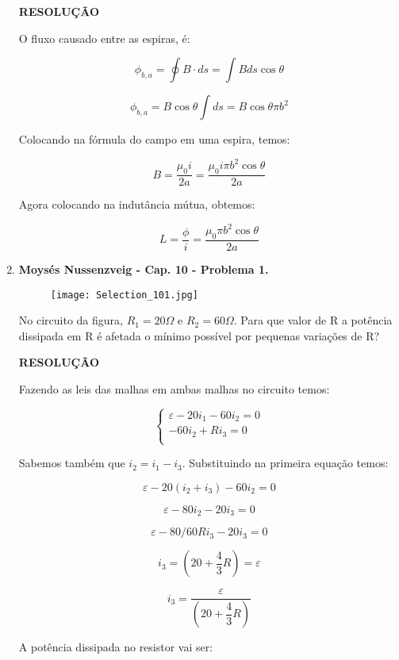 \documentclass[11pt,a4paper]{article}
\begin{document}
\begin{enumerate}
\textbf{RESOLUÇÃO}

O fluxo causado entre as espiras, é:

$$\phi_{b,a} = \displaystyle\oint B \cdot ds = \displaystyle\int B ds \cos \theta$$

$$\phi_{b,a} = B \cos \theta \displaystyle\int ds = B \cos \theta \pi b^2$$

Colocando na fórmula do campo em uma espira, temos:

$$B = \displaystyle\dfrac{\mu_0 i}{2a} = \displaystyle\dfrac{\mu_0 i \pi b^2 \cos \theta}{2a}$$

Agora colocando na indutância mútua, obtemos:

$$L = \displaystyle\dfrac{\phi}{i} = \displaystyle\dfrac{\mu_0 \pi b^2 \cos \theta}{2a}$$

\item \textbf{Moysés Nussenzveig - Cap. 10 - Problema 1.}

\begin{figure}[h]	
\centering %
\texttt{[image: Selection\_101.jpg]} 
\end{figure}

No circuito da figura, $R_1 = 20 \Omega$ e $R_2 = 60 \Omega$. Para que valor de R a potência dissipada em R é afetada o mínimo possível por pequenas variações de R?

\textbf{RESOLUÇÃO}

Fazendo as leis das malhas em ambas malhas no circuito temos:

$$
\begin{cases}
\varepsilon - 20 i_1 - 60 i_2 = 0 \\
-60 i_2 + R i_3 = 0 \\

\end{cases}
$$

Sabemos também que $i_2 = i_1 - i_3$. Substituindo na primeira equação temos:

$$\varepsilon - 20 (i_2 + i_3) - 60 i_2 = 0$$

$$\varepsilon - 80 i_2 - 20 i_3 = 0$$

$$\varepsilon - 80/60 R i_3 - 20 i_3 = 0$$

$$i_3 = \left( 20 + \displaystyle\dfrac{4}{3} R\right) = \varepsilon$$

$$i_3 = \displaystyle\dfrac{\varepsilon}{\left( 20 + \displaystyle\dfrac{4}{3} R\right)}$$

A potência dissipada no resistor vai ser:


\end{enumerate}
\end{document}
